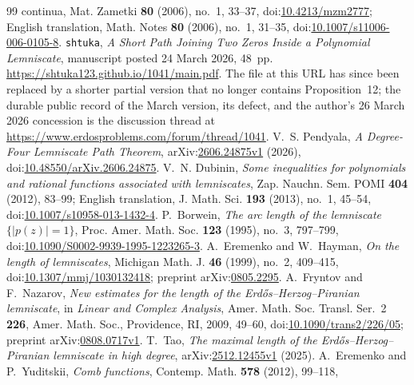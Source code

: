 \documentclass[11pt]{article}
\begin{document}
\begin{thebibliography}{99}
{  continua}, Mat. Zametki \textbf{80} (2006), no.~1, 33--37,
  doi:\href{https://doi.org/10.4213/mzm2777}{10.4213/mzm2777}; English
  translation, Math. Notes \textbf{80} (2006), no.~1, 31--35,
  doi:\href{https://doi.org/10.1007/s11006-006-0105-8}{10.1007/s11006-006-0105-8}.
 \texttt{shtuka},
  \emph{A Short Path Joining Two Zeros Inside a Polynomial Lemniscate},
  manuscript posted 24 March 2026, 48~pp.
  \url{https://shtuka123.github.io/1041/main.pdf}.
  The file at this URL has since been replaced by a shorter partial version
  that no longer contains Proposition~12; the durable public record of the
  March version, its defect, and the author's 26 March 2026 concession is the
  discussion thread at
  \url{https://www.erdosproblems.com/forum/thread/1041}.
 V.~S. Pendyala,
  \emph{A Degree-Four Lemniscate Path Theorem},
  arXiv:\href{https://arxiv.org/abs/2606.24875v1}{2606.24875v1} (2026),
  doi:\href{https://doi.org/10.48550/arXiv.2606.24875}
  {10.48550/arXiv.2606.24875}.
 V.~N. Dubinin, \emph{Some inequalities for polynomials and
  rational functions associated with lemniscates}, Zap. Nauchn. Sem. POMI
  \textbf{404} (2012), 83--99; English translation, J. Math. Sci. \textbf{193}
  (2013), no.~1, 45--54,
  doi:\href{https://doi.org/10.1007/s10958-013-1432-4}{10.1007/s10958-013-1432-4}.
 P.~Borwein,
  \emph{The arc length of the lemniscate $\{|p(z)|=1\}$},
  Proc. Amer. Math. Soc. \textbf{123} (1995), no.~3, 797--799,
  doi:\href{https://doi.org/10.1090/S0002-9939-1995-1223265-3}
  {10.1090/S0002-9939-1995-1223265-3}.
 A.~Eremenko and W.~Hayman,
  \emph{On the length of lemniscates}, Michigan Math. J. \textbf{46}
  (1999), no.~2, 409--415,
  doi:\href{https://doi.org/10.1307/mmj/1030132418}{10.1307/mmj/1030132418};
  preprint arXiv:\href{https://arxiv.org/abs/0805.2295}{0805.2295}.
 A.~Fryntov and F.~Nazarov,
  \emph{New estimates for the length of the Erd\H{o}s--Herzog--Piranian lemniscate},
  in \emph{Linear and Complex Analysis}, Amer. Math. Soc. Transl. Ser.~2
  \textbf{226}, Amer. Math. Soc., Providence, RI, 2009, 49--60,
  doi:\href{https://doi.org/10.1090/trans2/226/05}{10.1090/trans2/226/05};
  preprint arXiv:\href{https://arxiv.org/abs/0808.0717v1}{0808.0717v1}.
 T.~Tao,
  \emph{The maximal length of the Erd\H{o}s--Herzog--Piranian lemniscate in
  high degree}, arXiv:\href{https://arxiv.org/abs/2512.12455v1}{2512.12455v1}
  (2025).
 A.~Eremenko and P.~Yuditskii,
  \emph{Comb functions}, Contemp. Math. \textbf{578} (2012), 99--118,

\end{thebibliography}
\end{document}
